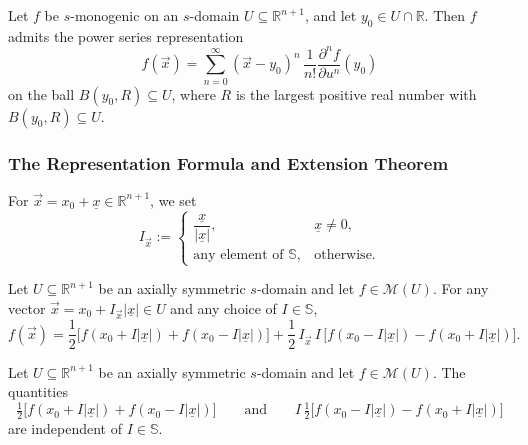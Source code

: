 \documentclass[11pt]{amsart}
\begin{document}
\begin{prop}\label{prop:power-series}
Let $f$ be $s$-monogenic on an $s$-domain $U \subseteq \mathbb{R}^{n+1}$, and let $y_0 \in U \cap \mathbb{R}$. Then $f$ admits the power series representation
\[
f(\vec x) = \sum_{n=0}^{\infty} (\vec x - y_0)^n \, \frac{1}{n!}\frac{\partial^n f}{\partial u^n}(y_0)
\]
on the ball $B(y_0, R) \subseteq U$, where $R$ is the largest positive real number with $B(y_0, R) \subseteq U$.
\end{prop}

\subsubsection{The Representation Formula and Extension Theorem}

For $\vec x = x_0 + \underline x \in \mathbb{R}^{n+1}$, we set
\[
I_{\vec x} := \begin{cases} \dfrac{\underline x}{|\underline x|}, & \underline x \ne 0,\\ \text{any element of } \mathbb{S}, & \text{otherwise.} \end{cases}
\]

\begin{thm}\label{thm:representation}
Let $U \subseteq \mathbb{R}^{n+1}$ be an axially symmetric $s$-domain and let $f \in \mathcal M(U)$. For any vector $\vec x = x_0 + I_{\vec x} |\underline x| \in U$ and any choice of $I \in \mathbb{S}$,
\begin{equation}\label{eq:representation}
f(\vec x) = \frac{1}{2}\bigl[f(x_0 + I|\underline x|) + f(x_0 - I|\underline x|)\bigr] + \frac{1}{2}\, I_{\vec x}\, I\, \bigl[f(x_0 - I|\underline x|) - f(x_0 + I|\underline x|)\bigr].
\end{equation}
\end{thm}

\begin{cor}\label{cor:slice-independence}
Let $U \subseteq \mathbb{R}^{n+1}$ be an axially symmetric $s$-domain and let $f \in \mathcal M(U)$. The quantities
\[
\tfrac{1}{2}\bigl[f(x_0 + I|\underline x|) + f(x_0 - I|\underline x|)\bigr] \qquad\text{and}\qquad I\, \tfrac{1}{2}\bigl[f(x_0 - I|\underline x|) - f(x_0 + I|\underline x|)\bigr]
\]
are independent of $I \in \mathbb{S}$.
\end{cor}
\end{document}
